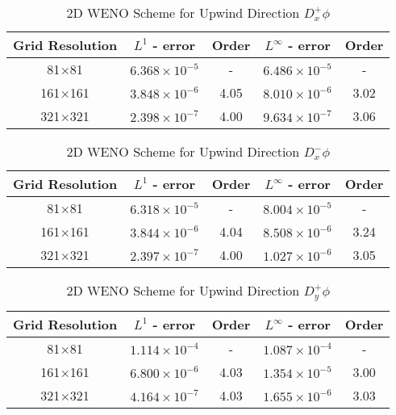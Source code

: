 \documentclass[oneside,12pt,final]{/Applications/TeX/packages/ucthesis-CA2012}
\begin{document}
\begin{mainmatter}
\clearpage
\newpage
\begin{table} [!h]
\caption{2D WENO Scheme for Upwind Direction $D_x^+ \phi$}
\label{table:2D_WENO_1}
\centering
\begin{tabular}{c c c c c}
\hline
Grid Resolution  & $L^1$ - error    & Order  & $L^\infty$ - error & Order \\ \hline
81$\times$81          & $6.368 \times 10^{-5}$  &   -    & $6.486 \times 10^{-5}$   &  -  \\
161$\times$161        & $3.848 \times 10^{-6}$  &  4.05  & $8.010 \times 10^{-6}$   & 3.02\\
321$\times$321        & $2.398 \times 10^{-7} $ &  4.00  & $9.634 \times 10^{-7}$   & 3.06\\
\end{tabular}
\end{table}

\begin{table} [!h]
\caption{2D WENO Scheme for Upwind Direction $D_x^- \phi$}
\centering
\begin{tabular}{c c c c c}
\hline
Grid Resolution  & $L^1$ - error    & Order  & $L^\infty$ - error & Order \\ \hline
81$\times$81          & $6.318 \times 10^{-5}$  &   -    & $8.004 \times10^{-5}$   &  -  \\
161$\times$161        & $3.844 \times 10^{-6}$  &  4.04  & $8.508 \times 10^{-6}$   & 3.24\\
321$\times$321        & $2.397 \times 10^{-7} $ &  4.00  & $1.027 \times 10^{-6}$   & 3.05\\
\end{tabular}
\end{table}


\begin{table} [!h]
\caption{2D WENO Scheme for Upwind Direction $D_y^+ \phi$}
\centering
\begin{tabular}{c c c c c}
\hline
Grid Resolution  & $L^1$ - error    & Order  & $L^\infty$ - error & Order \\ \hline
81$\times$81          & $1.114 \times 10^{-4} $ &   -    & $1.087 \times 10^{-4}$   &  -  \\
161$\times$161        & $6.800 \times 10^{-6} $ &  4.03  & $1.354 \times 10^{-5}$   & 3.00\\
321$\times$321        & $4.164 \times 10^{-7} $ &  4.03  & $1.655 \times 10^{-6} $  & 3.03\\
\end{tabular}
\end{table}



\end{mainmatter}
\end{document}
